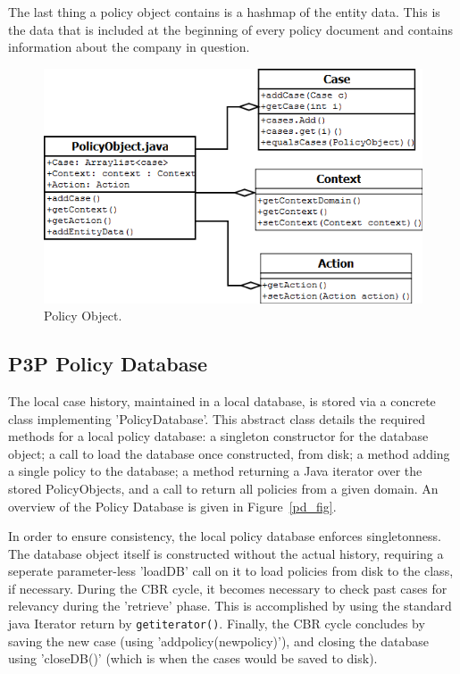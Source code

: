 The last thing a policy object contains is a hashmap of the entity data. This is the data that is included at the beginning of every policy document and contains information about the company in question.

\begin{figure}[htbp]
\begin{center}
\includegraphics[width = \textwidth]{DesignReport/uml/po.png}
\caption{Policy Object.}
\label{po_fig}
\end{center}
\end{figure}

\subsection{P3P Policy Database}
The local case history, maintained in a local database, is stored via a concrete class implementing 'PolicyDatabase'. This abstract class details the required methods for a local policy database: a singleton constructor for the database object; a call to load the database once constructed, from disk; a method adding a single policy to the database; a method returning a Java iterator over the stored PolicyObjects, and a call to return all policies from a given domain. An overview of the Policy Database is given in Figure~\ref{pd_fig}.

In order to ensure consistency, the local policy database enforces singletonness. The database object itself is constructed without the actual history, requiring a seperate parameter-less 'loadDB' call on it to load policies from disk to the class, if necessary.
During the CBR cycle, it becomes necessary to check past cases for relevancy during the 'retrieve' phase. This is accomplished by using the standard java Iterator return by \texttt{getiterator()}.
Finally, the CBR cycle concludes by saving the new case (using 'addpolicy(newpolicy)'), and closing the database using 'closeDB()' (which is when the cases would be saved to disk).



